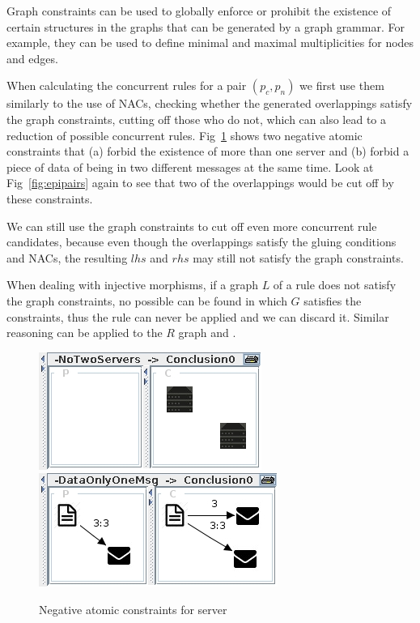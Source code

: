 Graph constraints can be used to globally enforce or prohibit the existence of certain structures in the graphs that can be generated by a graph grammar. For example, they can be used to define minimal and maximal multiplicities for nodes and edges.

When calculating the concurrent rules for a pair $(p_c, p_n)$ we first use them similarly to the use of NACs, checking whether the generated overlappings satisfy the graph constraints, cutting off those who do not, which can also lead to a reduction of possible concurrent rules. Fig~\ref{fig:constraints} shows two negative atomic constraints that (a) forbid the existence of more than one server and (b) forbid a piece of data of being in two different messages at the same time. Look at
Fig~\ref{fig:epipairs} again to see that two of the overlappings would be cut off by these constraints.

We can still use the graph constraints to cut off even more concurrent rule candidates, because even though the overlappings satisfy the gluing conditions and NACs, the resulting $lhs$ and $rhs$ may still not satisfy the graph constraints. 

When dealing with injective morphisms, if a graph $L$ of a rule does not satisfy the graph constraints, no possible \match{} can be found in which $G$ satisfies the constraints, thus the rule can never be applied and we can discard it. Similar reasoning can be applied to the $R$ graph and \comatch{}.

\begin{figure}
\centering
\includegraphics{grammar/no_two_servers}
\includegraphics{grammar/data_no_two_msgs}
\caption{\label{fig:constraints} Negative atomic constraints for server}
\end{figure}


